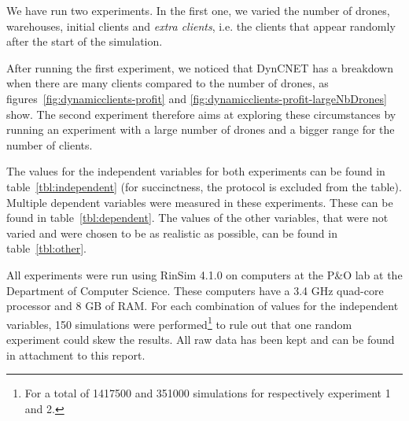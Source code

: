 \documentclass[10pt,a4paper,twocolumn]{article}
\begin{document}
We have run two experiments. In the first one, we varied the number of drones, warehouses, initial clients and \textit{extra clients}, i.e. the clients that appear randomly after the start of the simulation. 

After running the first experiment, we noticed that DynCNET has a breakdown when there are many clients compared to the number of drones, as figures~\ref{fig:dynamicclients-profit} and \ref{fig:dynamicclients-profit-largeNbDrones} show. The second experiment therefore aims at exploring these circumstances by running an experiment with a large number of drones and a bigger range for the number of clients.

The values for the independent variables for both experiments can be found in table~\ref{tbl:independent} (for succinctness, the protocol is excluded from the table). Multiple dependent variables were measured in these experiments. These can be found in table~\ref{tbl:dependent}.  The values of the other variables, that were not varied and were chosen to be as realistic as possible, can be found in table~\ref{tbl:other}.

All experiments were run using RinSim 4.1.0 on computers at the P\&O lab at the Department of Computer Science. These computers have a 3.4 GHz quad-core processor and 8 GB of RAM. For each combination of values for the independent variables, 150 simulations were performed\footnote{For a total of 1417500 and 351000 simulations for respectively experiment 1 and 2.} to rule out that one random experiment could skew the results. All raw data has been kept and can be found in attachment to this report.
\end{document}
